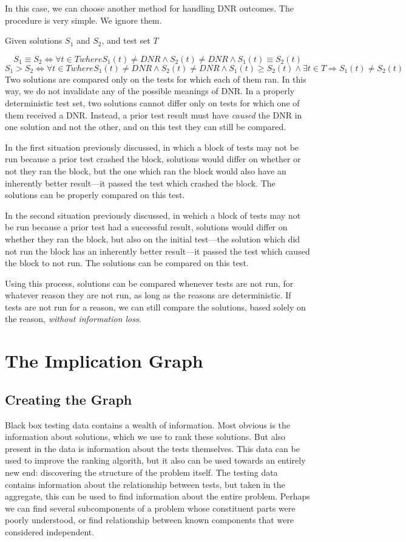 \documentclass[11pt]{article}
\begin{document}
In this case, we can choose another method for handling DNR outcomes. The procedure is very simple. We ignore them.

\centerline{Given solutions $S_1$ and $S_2$, and test set $T$}
$$S_1 \equiv S_2 \iff \forall t \in T where S_1(t) \neq DNR \wedge S_2(t) \neq DNR \wedge S_1(t) \equiv S_2(t)$$
$$S_1 > S_2 \iff \forall t \in T where S_1(t) \neq DNR \wedge S_2(t) \neq DNR \wedge S_1(t) \geq S_2(t) \wedge \exists t \in T \Rightarrow S_1(t) \neq S_2(t)$$
Two solutions are compared only on the tests for which each of them ran. In this way, we do not invalidate any of the possible meanings of DNR. In a properly deterministic test set, two solutions cannot differ only on tests for which one of them received a DNR. Instead, a prior test result must have \emph{caused} the DNR in one solution and not the other, and on this test they can still be compared. 

In the first situation previously discussed, in which a block of tests may not be run because a prior test crashed the block, solutions would differ on whether or not they ran the block, but the one which ran the block would also have an inherently better result---it passed the test which crashed the block. The solutions can be properly compared on this test.

In the second situation previously discussed, in wehich a block of tests may not be run because a prior test had a successful result, solutions would differ on whether they ran the block, but also on the initial test---the solution which did not run the block has an inherently better result---it passed the test which caused the block to not run. The solutions can be compared on this test.

Using this process, solutions can be compared whenever tests are not run, for whatever reason they are not run, as long as the reasons are deterministic. If tests are not run for a reason, we can still compare the solutions, based solely on the reason, \emph{without information loss}.

\section{The Implication Graph}
\subsection{Creating the Graph}
Black box testing data contains a wealth of information. Most obvious is the information about solutions, which we use to rank these solutions. But also present in the data is information about the tests themselves. This data can be used to improve the ranking algorith, but it also can be used towards an entirely new end: discovering the structure of the problem itself. The testing data contains information about the relationship between tests, but taken in the aggregate, this can be used to find information about the entire problem. Perhaps we can find several subcomponents of a problem whose constituent parts were poorly understood, or find relationship between known components that were considered independent.
\end{document}
